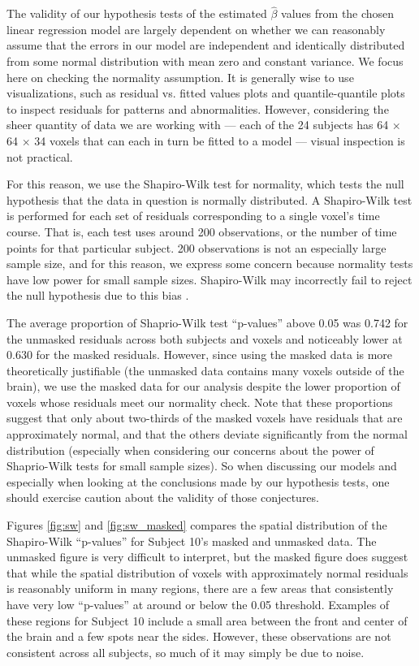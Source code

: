 \par \indent The validity of our hypothesis tests of the estimated 
$\hat{\beta}$ values from the chosen linear regression model are largely 
dependent on whether we can reasonably assume that the errors in our model 
are independent and identically distributed from some normal distribution 
with mean zero and constant variance. We focus here on checking the normality 
assumption. It is generally wise to use visualizations, such as residual vs. 
fitted values plots and quantile-quantile plots to inspect residuals for 
patterns and abnormalities. However, considering the sheer quantity of data 
we are working with --- each of the 24 subjects has 64 $\times$ 64 $\times$ 34 
voxels that can each in turn be fitted to a model --- visual inspection is 
not practical. 

For this reason, we use the Shapiro-Wilk test for normality, 
which tests the null hypothesis that the data in question is normally 
distributed. A Shapiro-Wilk test is performed for each set of residuals 
corresponding to a single voxel's time course. That is, each test uses around 
200 observations, or the number of time points for that particular subject. 
200 observations is not an especially large sample size, and for this reason, 
we express some concern because normality tests have low power for small 
sample sizes. Shapiro-Wilk may incorrectly fail to reject the null hypothesis 
due to this bias \cite{ghasemi2012normality}. 

The average proportion of Shaprio-Wilk test ``p-values'' above 0.05 was 0.742 
for the unmasked residuals across both subjects and voxels and noticeably 
lower at 0.630 for the masked residuals. However, since using the masked data 
is more theoretically justifiable (the unmasked data contains many voxels 
outside of the brain), we use the masked data for our analysis despite the 
lower proportion of voxels whose residuals meet our normality check. Note that 
these proportions suggest that only about two-thirds of the masked voxels have 
residuals that are approximately normal, and that the others deviate 
significantly from the normal distribution (especially when considering our 
concerns about the power of Shaprio-Wilk tests for small sample sizes). So when 
discussing our models and especially when looking at the conclusions made by 
our hypothesis tests, one should exercise caution about the validity of those 
conjectures. 

Figures \ref{fig:sw} and \ref{fig:sw_masked} compares the spatial distribution 
of the Shapiro-Wilk ``p-values'' for Subject 10's masked and unmasked data. 
The unmasked figure is very difficult to interpret, but the masked figure does 
suggest that while the spatial distribution of voxels with approximately 
normal residuals is reasonably uniform in many regions, there are a few areas 
that consistently have very low ``p-values'' at around or below the 0.05 
threshold. Examples of these regions for Subject 10 include a small area 
between the front and center of the brain and a few spots near the sides. 
However, these observations are not consistent across all subjects, so much 
of it may simply be due to noise. 

